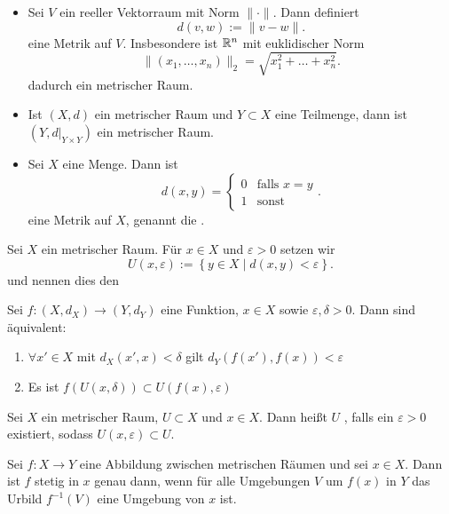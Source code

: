 \begin{example}
    \begin{itemize}
        \item 
    Sei $V$ ein reeller Vektorraum mit Norm  $\lVert \cdot  \rVert$. Dann definiert
    \[
        d(v,w) := \lVert v-w \rVert 
    .\] 
    eine Metrik auf $V$. Insbesondere ist $\mathbb{R}^n$ mit euklidischer Norm
    \[
        \lVert (x_1,\ldots,x_n) \rVert _2 = \sqrt{x_1^2 + \ldots + x_{n}^2} 
    .\] 
    dadurch ein metrischer Raum.
\item Ist $(X,d)$ ein metrischer Raum und  $Y\subset X$ eine Teilmenge, dann ist $(Y, d| _{Y\times Y})$ ein metrischer Raum.
\item Sei $X$ eine Menge. Dann ist
    \[
        d(x,y) = \begin{cases}
            0 & \text{falls } x=y \\
            1 & \text{sonst}
        \end{cases}
    .\] 
    eine Metrik auf $X$, genannt die .
    \end{itemize}
\end{example}
\begin{notation}
    Sei $X$ ein metrischer Raum. Für  $x\in X$ und $ε>0$ setzen wir
     \[
         U(x,ε) := \left \{y\in X \mid  d(x,y) < ε\right\} 
    .\] 
    und nennen dies den 
\end{notation}
\begin{observe}
    Sei $f: (X,d_X) \to  (Y,d_Y)$ eine Funktion, $x\in X$ sowie $ε,δ>0$. Dann sind äquivalent:
\begin{enumerate}[1)]
    \item $\forall x' \in X$ mit $d_X(x',x) < δ$ gilt  $d_Y(f(x'),f(x)) < ε$
    \item Es ist $f(U(x,\delta)) \subset U(f(x),ε)$
    \end{enumerate}
\end{observe}
\begin{definition}[Umgebung]\label{def:umgebung-metrischer-raum}
    Sei $X$ ein metrischer Raum,  $U\subset X$ und $x\in X$. Dann heißt $U$ , falls ein $ε>0$ existiert, sodass  $U(x,ε) \subset U$. 
\end{definition}
\begin{theorem}\label{thm:stetig-gdw-urbild-von-umgebung-ist-umgebung}
    Sei $f:X \to  Y$ eine Abbildung zwischen metrischen Räumen und sei $x\in X$. Dann ist $f$ stetig in  $x$ genau dann, wenn für alle Umgebungen  $V$ um  $f(x)$ in  $Y$ das Urbild  $f^{-1}(V)$ eine Umgebung von $x$ ist.
\end{theorem}

